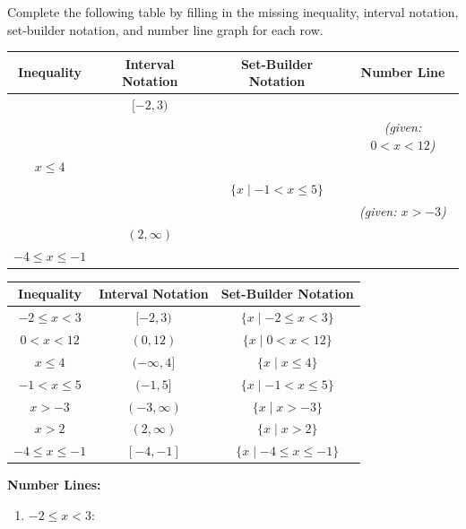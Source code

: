 \documentclass{ximera}
\begin{document}
\begin{problem}
Complete the following table by filling in the missing inequality, interval notation,
set-builder notation, and number line graph for each row.

\medskip
\begin{center}
\begin{tabular}{|c|c|c|c|}
\hline
\textbf{Inequality} & \textbf{Interval Notation} & \textbf{Set-Builder Notation} & \textbf{Number Line} \\
\hline
& $[-2,3)$ & & \\[10pt]
\hline
& & & \textit{(given: $0 < x < 12$)} \\[10pt]
\hline
$x \leq 4$ & & & \\[10pt]
\hline
& & $\big\{x \mid -1 < x \leq 5\big\}$ & \\[10pt]
\hline
& & & \textit{(given: $x > -3$)} \\[10pt]
\hline
& $(2,\infty)$ & & \\[10pt]
\hline
$-4 \leq x \leq -1$ & & & \\[10pt]
\hline
\end{tabular}
\end{center}

\begin{solution}
\begin{center}
\begin{tabular}{|c|c|c|}
\hline
\textbf{Inequality} & \textbf{Interval Notation} & \textbf{Set-Builder Notation} \\
\hline
$-2 \leq x < 3$ & $[-2,3)$ & $\{x \mid -2 \leq x < 3\}$ \\[6pt]
\hline
$0 < x < 12$ & $(0,12)$ & $\{x \mid 0 < x < 12\}$ \\[6pt]
\hline
$x \leq 4$ & $(-\infty,4]$ & $\{x \mid x \leq 4\}$ \\[6pt]
\hline
$-1 < x \leq 5$ & $(-1,5]$ & $\{x \mid -1 < x \leq 5\}$ \\[6pt]
\hline
$x > -3$ & $(-3,\infty)$ & $\{x \mid x > -3\}$ \\[6pt]
\hline
$x > 2$ & $(2,\infty)$ & $\{x \mid x > 2\}$ \\[6pt]
\hline
$-4 \leq x \leq -1$ & $[-4,-1]$ & $\{x \mid -4 \leq x \leq -1\}$ \\[6pt]
\hline
\end{tabular}
\end{center}

\medskip
\textbf{Number Lines:}

\begin{enumerate}
  \item $-2 \leq x < 3$:


\end{enumerate}
\end{solution}
\end{problem}
\end{document}
